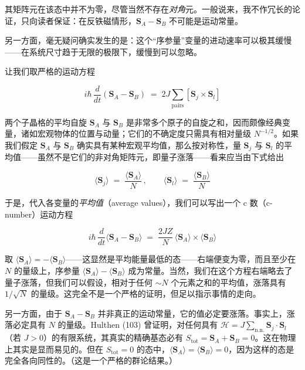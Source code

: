 其矩阵元在该态中并不为零，尽管当然不存在\emph{对角}元。一般说来，我不作冗长的论证，只向读者保证：在反铁磁情形，$\mathbf{S}_A - \mathbf{S}_B$ 不可能是运动常量。

另一方面，毫无疑问确实发生的是：这个“序参量”变量的进动速率可以极其缓慢——在系统尺寸趋于无限的极限下，缓慢到可以忽略。

让我们取严格的运动方程

\begin{equation*}
i\hbar\,\frac{d}{dt}\left(\mathbf{S}_A - \mathbf{S}_B\right) \;=\; 2J\sum_{\text{pairs}}\left[\mathbf{S}_j \times \mathbf{S}_l\right]
\end{equation*}

两个子晶格的平均自旋 $\mathbf{S}_A$ 与 $\mathbf{S}_B$ 是非常多个原子的自旋之和，因而颇像经典变量，诸如宏观物体的位置与动量；它们的不确定度只需具有相对量级 $N^{-1/2}$。如果我们假定 $\mathbf{S}_A$ 与 $\mathbf{S}_B$ 确实具有某种宏观平均值，那么按对称性，量 $\mathbf{S}_j$ 与 $\mathbf{S}_l$ 的平均值——虽然不是它们的非对角矩阵元，即量子涨落——看来应当由下式给出

\begin{equation*}
\langle \mathbf{S}_j\rangle \;=\; \frac{\langle \mathbf{S}_A\rangle}{N}\,,\qquad \langle \mathbf{S}_l\rangle \;=\; \frac{\langle \mathbf{S}_B\rangle}{N}
\end{equation*}

于是，代入各变量的\emph{平均值}（average values），我们可以写出一个 c 数（c-number）运动方程

\begin{equation*}
i\hbar\,\frac{d}{dt}\langle \mathbf{S}_A - \mathbf{S}_B\rangle \;=\; \frac{2JZ}{N}\,\langle \mathbf{S}_A\rangle \times \langle \mathbf{S}_B\rangle
\end{equation*}

取 $\langle \mathbf{S}_A\rangle = -\langle \mathbf{S}_B\rangle$——这显然是平均能量最低的态——右端便变为零，而且至少在 $N$ 的量级上，序参量 $\langle \mathbf{S}_A\rangle - \langle \mathbf{S}_B\rangle$ 成为常量。当然，我们在这个方程右端略去了量子涨落，但我们可以假设，相对于任何 $\sim N$ 个元素之和的平均值，涨落具有 $1/\sqrt{N}$ 的量级。这完全不是一个严格的证明，但足以指示事情的走向。

另一方面，由于 $\mathbf{S}_A - \mathbf{S}_B$ 并非真正的运动常量，它的值必定要涨落。事实上，涨落必定具有 $N$ 的量级。Hulthen (103) 曾证明，对任何具有 $\mathcal{H} = J\sum_{\text{n.n.}}\mathbf{S}_j\cdot\mathbf{S}_l$（若 $J>0$）的有限系统，其真实的精确基态必有 $S_{\text{tot}} = \mathbf{S}_A + \mathbf{S}_B = 0$。这在物理上其实是显而易见的。但在 $S_{\text{tot}} = 0$ 的态中，$\langle \mathbf{S}_A\rangle = \langle \mathbf{S}_B\rangle = 0$，因为这样的态是完全各向同性的。（这是一个严格的群论结果。）

